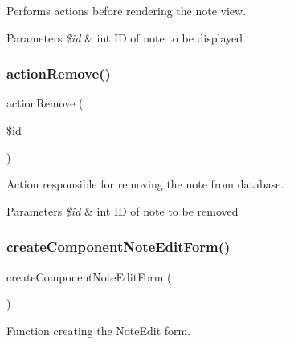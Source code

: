 Performs actions before rendering the note view.


\begin{DoxyParams}{Parameters}
{\em \$id} & int ID of note to be displayed \\
\hline
\end{DoxyParams}
\mbox{\label{class_app_1_1_presenters_1_1_note_presenter_ab7e4d6093e671c38971e19e7a45f322b}} 
\subsubsection{\texorpdfstring{action\+Remove()}{actionRemove()}}
{\footnotesize\ttfamily action\+Remove (\begin{DoxyParamCaption}\item[{}]{\$id }\end{DoxyParamCaption})}

Action responsible for removing the note from database.


\begin{DoxyParams}{Parameters}
{\em \$id} & int ID of note to be removed \\
\hline
\end{DoxyParams}
\mbox{\label{class_app_1_1_presenters_1_1_note_presenter_adbe06f4aac8adda69c1cf4cefcc9c58d}} 
\subsubsection{\texorpdfstring{create\+Component\+Note\+Edit\+Form()}{createComponentNoteEditForm()}}
{\footnotesize\ttfamily create\+Component\+Note\+Edit\+Form (\begin{DoxyParamCaption}{ }\end{DoxyParamCaption})}

Function creating the Note\+Edit form.

